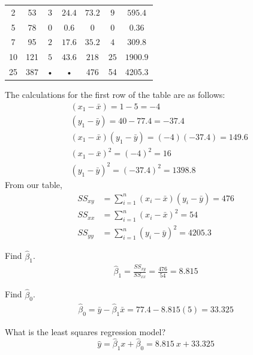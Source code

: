 \begin{example}
\begin{benumerate}
\begin{center}
\begin{tabular}{c|c|c|c|c|c|c}
2 & 53 & $3$ & $24.4$ & $73.2$ & $9$ & $595.4$ \\ 
 
5 & 78 & $0$ & $0.6$ & $0$ & $0$ & $0.36$ \\ 
 
7 & 95 & $2$ & $17.6$ & $35.2$ & $4$ & $309.8$ \\ 

10 & 121 & $5$ & $43.6$ & $218$ & $ 25$ & $1900.9$ \\ 
\hline 
25 & $387$ & • & • & 476 & 54 & 4205.3 \\ 
\end{tabular}
\end{center}
The calculations for the first row of the table are as follows:
\begin{align*}
&(x_1 - \bar{x}) = 1-5 = -4 \\
&(y_1 - \bar{y}) = 40-77.4 = -37.4 \\
&(x_1 - \bar{x})(y_1-\bar{y}) = (-4)(-37.4) = 149.6 \\
&(x_1 - \bar{x})^2 = (-4)^2 = 16 \\
&(y_1 - \bar{y})^2 = (-37.4)^2 = 1398.8
\end{align*}
From our table, 
\begin{align*}
SS_{xy} &= \sum_{i=1}^{n} (x_i - \bar{x})(y_i-\bar{y}) = 476 \\
SS_{xx} &= \sum_{i=1}^{n} (x_i - \bar{x})^2 = 54 \\
SS_{yy} &= \sum_{i=1}^{n} (y_i - \bar{y})^2 = 4205.3
\end{align*}
\item Find $\hat{\beta}_1$.
\begin{align*}
\hat{\beta}_1 = \frac{SS_{xy}}{SS_{xx}} = \frac{476}{54} = 8.815
\end{align*}
\item Find $\hat{\beta}_0$.
\begin{align*}
\hat{\beta}_0 = \bar{y} - \hat{\beta}_1 \bar{x} = 77.4-8.815(5) = 33.325
\end{align*}
\item What is the least squares regression model?
\[ \hat{y} = \hat{\beta}_1 x +\hat{\beta}_0 = 8.815~x + 33.325 \]


\end{benumerate}
\end{example}
